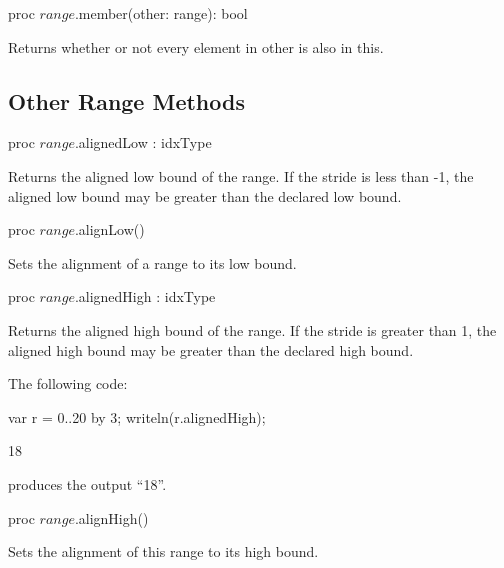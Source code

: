 \begin{protohead}
proc $range$.member(other: range): bool
\end{protohead}
\begin{protobody}
Returns whether or not every element in other is also in this.
\end{protobody}

\subsection{Other Range Methods}

\begin{protohead}
proc $range$.alignedLow : idxType
\end{protohead}
\begin{protobody}
Returns the aligned low bound of the range.  If the stride is less than -1, the
aligned low bound may be greater than the declared low bound.
\end{protobody}

\begin{protohead}
proc $range$.alignLow()
\end{protohead}
\begin{protobody}
Sets the alignment of a range to its low bound.
\end{protobody}

\begin{protohead}
proc $range$.alignedHigh : idxType
\end{protohead}
\begin{protobody}
Returns the aligned high bound of the range.  If the stride is greater than 1,
the aligned high bound may be greater than the declared high bound.
\end{protobody}
\begin{example}
The following code:
\begin{chapelpre}
\end{chapelpre}
\begin{chapel}
var r = 0..20 by 3;
writeln(r.alignedHigh);
\end{chapel}
\begin{chapeloutput}
18
\end{chapeloutput}
produces the output ``18''.
\end{example}

\begin{protohead}
proc $range$.alignHigh()
\end{protohead}
\begin{protobody}
Sets the alignment of this range to its high bound.
\end{protobody}

